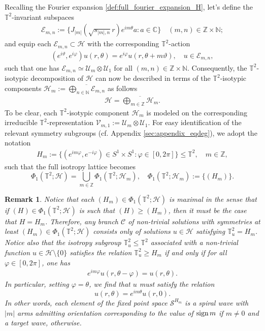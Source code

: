 \documentclass[11pt]{amsart}
\def\bc{{\mathbb{C}}}
\def\bn{{\mathbb{N}}}
\def\bz{{\mathbb{Z}}}
\def\bt{{\mathbb{T}}}
\def\sign{\text{\rm sign\,}}
\newtheorem{remark}{Remark}[section]
\begin{document}
Recalling the Fourier expansion \eqref{def:full_fourier_expansion_H}, let's define the $\bt^2$-invariant subspaces
\begin{align*}
    \mathscr E_{m,n} := \{ J_{|m|}(\sqrt{s_{|m|,n}} r)e^{im \theta}a : a \in \bc \} \quad (m,n) \in  \bz \times \bn;
\end{align*}
and equip each $\mathscr E_{m,n} \subset \mathscr H$ with the corresponding $\bt^2$-action
\begin{align*}
(e^{i \vartheta},e^{i \varphi}) u(r,\theta) =  e^{i \varphi}u(r,\theta + m\vartheta), \quad u \in \mathscr E_{m,n},
\end{align*}
such that one has $\mathscr E_{m,n} \simeq \mathcal U_m \otimes \mathcal U_1$ for all $(m,n) \in \bz \times \bn$.
Consequently, the $\bt^2$-isotypic decomposition of $\mathscr H$ can  now be described in terms of the $\bt^2$-isotypic components $\mathscr H_{m} := \overline{\bigoplus_{n \in \bn } \mathscr E_{m,n}}$ as follows
\begin{align}\label{eq:G_isotypic_decomp}
    \mathscr H = \overline{\bigoplus_{m\in \bz} \mathscr H_{m}}.
\end{align}
To be clear, each $\bt^2$-isotypic component $\mathscr H_{m}$ is modeled on the corresponding irreducible $\bt^2$-representation $\mathcal V_{m,1} := \mathcal U_m \otimes \mathcal U_1$. For easy identification of the relevant symmetry subgroups (cf. Appendix \ref{sec:appendix_eqdeg}), we adopt the notation
\begin{align}\label{def:subgroup_identification}
  H_m := \{ (e^{im\varphi},e^{-i\varphi}) \in S^1 \times S^1 : \varphi \in[0,2\pi] \} \leq \bt^2, \quad m \in \bz,  
\end{align}
such that the full isotropy lattice becomes 
\[
\Phi_1(\bt^2;\mathscr H) = \bigcup_{m \in \bz} \Phi_1(\bt^2;\mathscr H_m), \quad \Phi_1(\bt^2;\mathscr H_m) := \{(H_m) \}.
\]
\begin{remark}\label{rm:orbit_type_identification}
Notice that each $(H_m) \in \Phi_1(\bt^2;\mathscr H)$ is maximal in the sense that if $(H) \in \Phi_1(\bt^2;\mathscr H)$ is such that $(H) \geq (H_m)$, then it must be the case that $H = H_m$. Therefore, any branch $\mathcal C$ of non-trivial solutions with symmetries at least $(H_m) \in \Phi_1(\bt^2;\mathscr H)$ consists only of solutions $u \in \mathscr H$ satisfying $\bt^2_u = H_m$. Notice also that the isotropy subgroup  $\bt^2_u \leq \bt^2$ associated with a non-trivial function $u \in \mathscr H \setminus \{0\}$ satisfies the relation $\bt^2_u \geq H_{m}$ if and only if for all $\varphi \in [0,2\pi]$, one has
\begin{align*}
   e^{im\varphi}u(r,\theta - \varphi) = u(r,\theta).
\end{align*}
In particular, setting $\varphi = \theta$, we find that $u$ must satisfy the relation
\[
u(r,\theta) = e^{im\theta}u(r,0).
\]
In other words, each element of the fixed point space $\mathscr S^{H_m}$ is a spiral wave with $|m|$ arms admitting orientation corresponding to the value of $\sign m$ if $m \neq 0$ and a target wave, otherwise. 
\end{remark}
\end{document}
